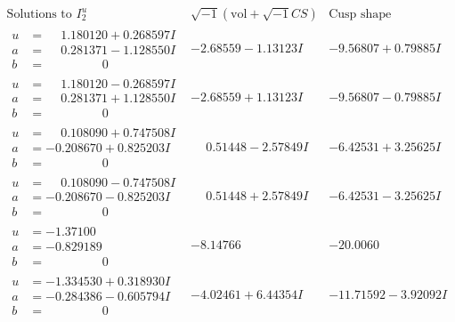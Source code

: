 \documentclass[1p]{elsarticle_modified}
\theoremstyle{definition}
\newcommand{\I}{\sqrt{-1}}
\begin{document}
$$\begin{array}{c|c|c}  
\text{Solutions to }I^u_{2}& \I (\text{vol} + \sqrt{-1}CS) & \text{Cusp shape}\\
 \hline 
\begin{aligned}
u &= \phantom{-}1.180120 + 0.268597 I \\
a &= \phantom{-}0.281371 - 1.128550 I \\
b &= \phantom{-0.000000 } 0\end{aligned}
 & -2.68559 - 1.13123 I & -9.56807 + 0.79885 I \\ \hline\begin{aligned}
u &= \phantom{-}1.180120 - 0.268597 I \\
a &= \phantom{-}0.281371 + 1.128550 I \\
b &= \phantom{-0.000000 } 0\end{aligned}
 & -2.68559 + 1.13123 I & -9.56807 - 0.79885 I \\ \hline\begin{aligned}
u &= \phantom{-}0.108090 + 0.747508 I \\
a &= -0.208670 + 0.825203 I \\
b &= \phantom{-0.000000 } 0\end{aligned}
 & \phantom{-}0.51448 - 2.57849 I & -6.42531 + 3.25625 I \\ \hline\begin{aligned}
u &= \phantom{-}0.108090 - 0.747508 I \\
a &= -0.208670 - 0.825203 I \\
b &= \phantom{-0.000000 } 0\end{aligned}
 & \phantom{-}0.51448 + 2.57849 I & -6.42531 - 3.25625 I \\ \hline\begin{aligned}
u &= -1.37100\phantom{ +0.000000I} \\
a &= -0.829189\phantom{ +0.000000I} \\
b &= \phantom{-0.000000 } 0\end{aligned}
 & -8.14766\phantom{ +0.000000I} & -20.0060\phantom{ +0.000000I} \\ \hline\begin{aligned}
u &= -1.334530 + 0.318930 I \\
a &= -0.284386 - 0.605794 I \\
b &= \phantom{-0.000000 } 0\end{aligned}
 & -4.02461 + 6.44354 I & -11.71592 - 3.92092 I \\ \hline\begin{aligned}

\end{aligned}
\end{array}$$
\end{document}
